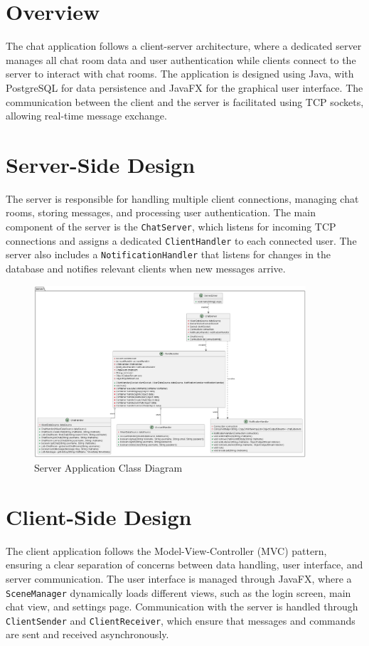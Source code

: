 \documentclass[12pt,a4paper]{report}
\begin{document}
\section{Overview}
The chat application follows a client-server architecture, where a dedicated
server manages all chat room data and user authentication while clients connect
to the server to interact with chat rooms. The application is designed using
Java, with PostgreSQL for data persistence and JavaFX for the graphical user
interface. The communication between the client and the server is facilitated
using TCP sockets, allowing real-time message exchange.

\section{Server-Side Design}
The server is responsible for handling multiple client connections, managing
chat rooms, storing messages, and processing user authentication. The main
component of the server is the \texttt{ChatServer}, which listens for incoming
TCP connections and assigns a dedicated \texttt{ClientHandler} to each
connected user. The server also includes a \texttt{NotificationHandler} that
listens for changes in the database and notifies relevant clients when new
messages arrive.

\begin{figure}[H]
  \centering
  \includegraphics[width=0.9\textwidth]{Server.png}
  \caption{Server Application Class Diagram}
  \label{fig:server_class_diagram}
\end{figure}

\section{Client-Side Design}
The client application follows the Model-View-Controller (MVC) pattern,
ensuring a clear separation of concerns between data handling, user interface,
and server communication. The user interface is managed through JavaFX, where a
\texttt{SceneManager} dynamically loads different views, such as the login
screen, main chat view, and settings page. Communication with the server is
handled through \texttt{ClientSender} and \texttt{ClientReceiver}, which ensure
that messages and commands are sent and received asynchronously.
\end{document}
